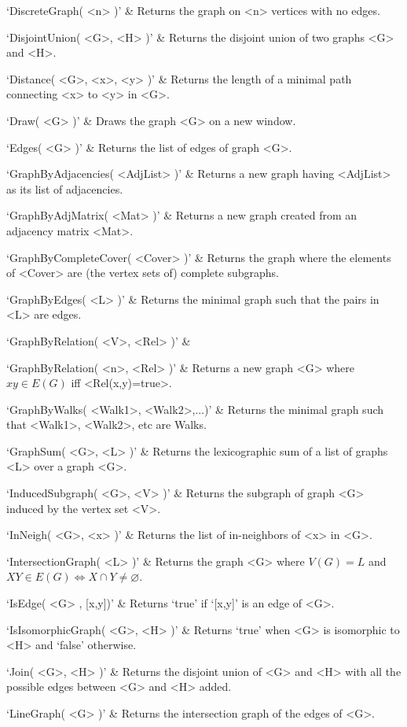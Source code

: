 `DiscreteGraph( <n> )' & 
Returns the graph on <n> vertices with no edges.

`DisjointUnion( <G>, <H> )' & 
Returns the disjoint union of two graphs <G> and <H>.

`Distance( <G>, <x>, <y> )' & 
Returns the length of a minimal path connecting <x> to <y> in <G>.

`Draw( <G> )' & 
Draws the graph <G> on a new window.

`Edges( <G> )' & 
Returns the list of edges of graph <G>.

`GraphByAdjacencies( <AdjList> )' & 
Returns  a  new  graph  having  <AdjList>  as its list of adjacencies.

`GraphByAdjMatrix( <Mat> )' & 
Returns  a  new  graph  created from an adjacency matrix <Mat>.

`GraphByCompleteCover( <Cover> )' & 
Returns the graph where the elements of <Cover> are (the vertex sets of) complete subgraphs.

`GraphByEdges( <L> )' & 
Returns the minimal graph such that the pairs in <L> are edges.

`GraphByRelation( <V>, <Rel> )' & 

`GraphByRelation( <n>, <Rel> )' & 
Returns  a  new  graph  <G> where $xy \in E(G)$ iff <Rel(x,y)=true>.

`GraphByWalks( <Walk1>, <Walk2>,...)' & 
Returns the minimal graph such that <Walk1>, <Walk2>, etc are Walks.

`GraphSum( <G>, <L> )' & 
Returns the lexicographic sum of a list of graphs <L> over a graph <G>.

`InducedSubgraph( <G>, <V> )' & 
Returns the subgraph of graph <G> induced by the vertex set <V>.

`InNeigh( <G>, <x> )' & 
Returns the list of in-neighbors of <x> in <G>.

`IntersectionGraph( <L> )' & 
Returns the graph <G> where $V(G)=L$ and $XY\in E(G) \iff X\cap Y \neq \varnothing$.

`IsEdge( <G> , [x,y])' & 
Returns `true' if `[x,y]' is an edge of <G>.

`IsIsomorphicGraph( <G>, <H> )' & 
Returns `true' when <G> is isomorphic to <H> and `false' otherwise.

`Join( <G>, <H> )' & 
Returns the disjoint union of <G> and <H> with all the possible edges between <G> and <H> added.

`LineGraph( <G> )' & 
Returns the intersection graph of the edges of <G>.

